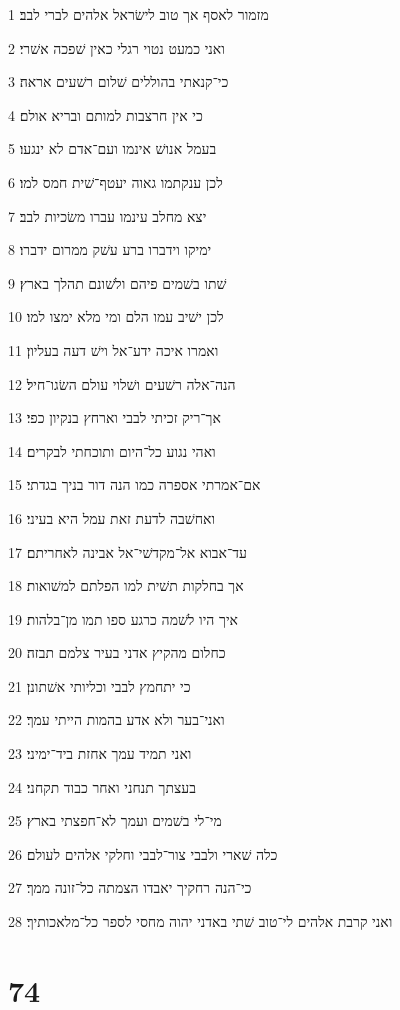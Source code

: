 \par 1 מזמור לאסף אך טוב לישׂראל אלהים לברי לבב׃
\par 2 ואני כמעט נטוי רגלי כאין שׁפכה אשׁרי׃
\par 3 כי־קנאתי בהוללים שׁלום רשׁעים אראה׃
\par 4 כי אין חרצבות למותם ובריא אולם׃
\par 5 בעמל אנושׁ אינמו ועם־אדם לא ינגעו׃
\par 6 לכן ענקתמו גאוה יעטף־שׁית חמס למו׃
\par 7 יצא מחלב עינמו עברו משׂכיות לבב׃
\par 8 ימיקו וידברו ברע עשׁק ממרום ידברו׃
\par 9 שׁתו בשׁמים פיהם ולשׁונם תהלך בארץ׃
\par 10 לכן ישׁיב עמו הלם ומי מלא ימצו למו׃
\par 11 ואמרו איכה ידע־אל וישׁ דעה בעליון׃
\par 12 הנה־אלה רשׁעים ושׁלוי עולם השׂגו־חיל׃
\par 13 אך־ריק זכיתי לבבי וארחץ בנקיון כפי׃
\par 14 ואהי נגוע כל־היום ותוכחתי לבקרים׃
\par 15 אם־אמרתי אספרה כמו הנה דור בניך בגדתי׃
\par 16 ואחשׁבה לדעת זאת עמל היא בעיני׃
\par 17 עד־אבוא אל־מקדשׁי־אל אבינה לאחריתם׃
\par 18 אך בחלקות תשׁית למו הפלתם למשׁואות׃
\par 19 איך היו לשׁמה כרגע ספו תמו מן־בלהות׃
\par 20 כחלום מהקיץ אדני בעיר צלמם תבזה׃
\par 21 כי יתחמץ לבבי וכליותי אשׁתונן׃
\par 22 ואני־בער ולא אדע בהמות הייתי עמך׃
\par 23 ואני תמיד עמך אחזת ביד־ימיני׃
\par 24 בעצתך תנחני ואחר כבוד תקחני׃
\par 25 מי־לי בשׁמים ועמך לא־חפצתי בארץ׃
\par 26 כלה שׁארי ולבבי צור־לבבי וחלקי אלהים לעולם׃
\par 27 כי־הנה רחקיך יאבדו הצמתה כל־זונה ממך׃
\par 28 ואני קרבת אלהים לי־טוב שׁתי באדני יהוה מחסי לספר כל־מלאכותיך׃

\chapter{74}

